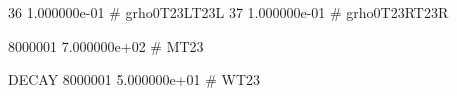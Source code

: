    36 1.000000e-01 # grho0T23LT23L 
   37 1.000000e-01 # grho0T23RT23R 

  8000001 7.000000e+02 # MT23 

DECAY 8000001 5.000000e+01 # WT23 